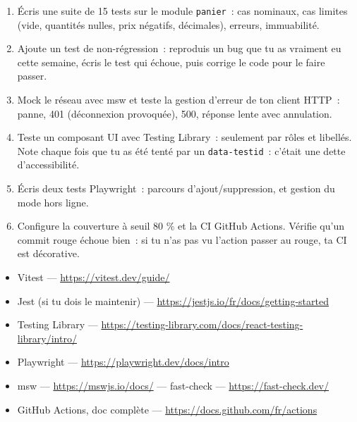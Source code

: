 \begin{exercice}
\begin{enumerate}
  \item \'Ecris une suite de 15 tests sur le module \verb|panier|~: cas nominaux, cas limites
        (vide, quantit\'es nulles, prix n\'egatifs, d\'ecimales), erreurs, immuabilit\'e.
  \item Ajoute un test de non-r\'egression~: reproduis un bug que tu as vraiment eu cette semaine,
        \'ecris le test qui \'echoue, puis corrige le code pour le faire passer.
  \item Mock le r\'eseau avec msw et teste la gestion d'erreur de ton client HTTP~: panne,
        401 (d\'econnexion provoqu\'ee), 500, r\'eponse lente avec annulation.
  \item Teste un composant UI avec Testing Library~: seulement par r\^oles et libell\'es. Note
        chaque fois que tu as \'et\'e tent\'e par un \verb|data-testid|~: c'\'etait une dette d'accessibilit\'e.
  \item \'Ecris deux tests Playwright~: parcours d'ajout/suppression, et gestion du mode hors ligne.
  \item Configure la couverture \`a seuil 80 \% et la CI GitHub Actions. V\'erifie qu'un commit
        rouge \'echoue bien~: si tu n'as pas vu l'action passer au rouge, ta CI est d\'ecorative.
\end{enumerate}
\end{exercice}

\begin{ressources}
\begin{itemize}
  \item Vitest --- \url{https://vitest.dev/guide/}
  \item Jest (si tu dois le maintenir) --- \url{https://jestjs.io/fr/docs/getting-started}
  \item Testing Library --- \url{https://testing-library.com/docs/react-testing-library/intro/}
  \item Playwright --- \url{https://playwright.dev/docs/intro}
  \item msw --- \url{https://mswjs.io/docs/} --- fast-check --- \url{https://fast-check.dev/}
  \item GitHub Actions, doc compl\`ete --- \url{https://docs.github.com/fr/actions}
\end{itemize}
\end{ressources}

